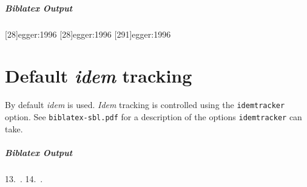 \documentclass[a4paper]{article}
\newenvironment{biboutput}{%
  \subparagraph{Biblatex Output}
}{\color{black}}
\begin{document}
\makeatletter
\let\blx@imc@ifloccit\blx@ifloccit@global
\let\blx@loccittracker\blx@loccittracker@global
\let\blx@loccitreset\blx@loccitreset@global
\makeatother

\begin{biboutput}
  [28]{egger:1996}
  [28]{egger:1996}
  [291]{egger:1996}
\end{biboutput}

\section*{Default \emph{idem} tracking}

By default \emph{idem} is used. \emph{Idem} tracking is controlled using the
\texttt{idemtracker} option. See \texttt{biblatex-sbl.pdf} for a description
of the options \texttt{idemtracker} can take.

\begin{biboutput}
  \makeatletter\blx@opt@idemtracker@constrict\makeatother
  \color{biblatex-colour}
  \hspace*{\bibindent}13.~\cites[35]{vanseters:1997}{vanseters:1995}.
  \color{black}
  \makeatletter\blx@idemreset\makeatother
  \color{biblatex-colour}
  \hspace*{\bibindent}14.~\cites[35]{vanseters:1997}[222]{vanseters:1995}.
  \color{black}
\end{biboutput}

\printbibliography

\printindex
\end{document}
